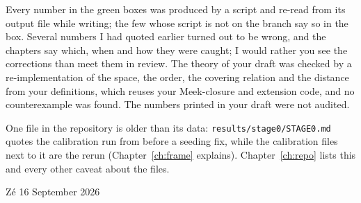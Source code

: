 Every number in the green boxes was produced by a script and re-read from its output file while
writing; the few whose script is not on the branch say so in the box. Several numbers I had quoted earlier turned out to be wrong, and the chapters
say which, when and how they were caught; I would rather you see the corrections than meet them in
review. The theory of your draft was checked by a re-implementation of the space, the order, the covering
relation and the distance from your definitions, which reuses your Meek-closure and extension code,
and no counterexample was found. The numbers printed in your draft were not audited.

One file in the repository is older than its data: \texttt{results/stage0/STAGE0.md} quotes the
calibration run from before a seeding fix, while the calibration files next to it are the rerun
(Chapter~\ref{ch:frame} explains). Chapter~\ref{ch:repo} lists this and every other caveat about
the files.

Zé \hfill 16 September 2026
